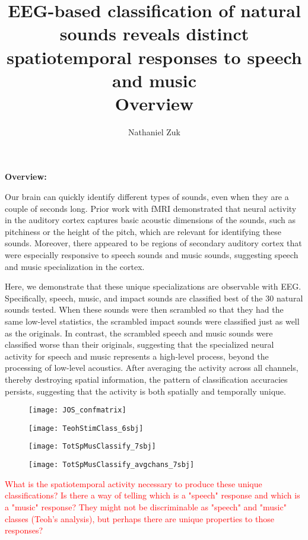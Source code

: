 \documentclass[11pt]{article}
\title{
    EEG-based classification of natural sounds reveals distinct spatiotemporal responses to speech and music \\
    Overview
}
\author{Nathaniel Zuk}
\begin{document}
\maketitle

\textbf{Overview:}

Our brain can quickly identify different types of sounds, even when they are a couple of seconds long.  Prior work with fMRI demonstrated that neural activity in the auditory cortex captures basic acoustic dimensions of the sounds, such as pitchiness or the height of the pitch, which are relevant for identifying these sounds.  Moreover, there appeared to be regions of secondary auditory cortex that were especially responsive to speech sounds and music sounds, suggesting speech and music specialization in the cortex.  

Here, we demonstrate that these unique specializations are observable with EEG.  Specifically, speech, music, and impact sounds are classified best of the 30 natural sounds tested.  When these sounds were then scrambled so that they had the same low-level statistics, the scrambled impact sounds were classified just as well as the originals.  In contrast, the scrambled speech and music sounds were classified worse than their originals, suggesting that the specialized neural activity for speech and music represents a high-level process, beyond the processing of low-level acoustics.  After averaging the activity across all channels, thereby destroying spatial information, the pattern of classification accuracies persists, suggesting that the activity is both spatially and temporally unique.

\begin{figure}[H]
\texttt{[image: JOS\_confmatrix]}
\centering
\end{figure}

\begin{figure}[H]
\texttt{[image: TeohStimClass\_6sbj]}
\centering
\end{figure}

\begin{figure}[H]
\texttt{[image: TotSpMusClassify\_7sbj]}
\centering
\end{figure}

\begin{figure}[H]
\texttt{[image: TotSpMusClassify\_avgchans\_7sbj]}
\centering
\end{figure}

\hrulefill

\textcolor{red}{What is the spatiotemporal activity necessary to produce these unique classifications?  Is there a way of telling which is a "speech" response and which is a "music" response?  They might not be discriminable as "speech" and "music" classes (Teoh's analysis), but perhaps there are unique properties to those responses?}
\end{document}
